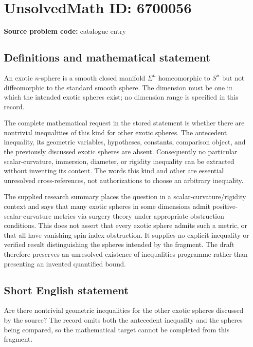 \documentclass[11pt]{article}
\begin{document}
\section*{UnsolvedMath ID: 6700056}
\textbf{Source problem code:} catalogue entry
\subsection{Definitions and mathematical statement}
An exotic \(n\)-sphere is a smooth closed manifold \(\Sigma^n\) homeomorphic to \(S^n\) but not diffeomorphic to the standard smooth sphere. The dimension must be one in which the intended exotic spheres exist; no dimension range is specified in this record.

The complete mathematical request in the stored statement is whether there are nontrivial inequalities of this kind for other exotic spheres. The antecedent inequality, its geometric variables, hypotheses, constants, comparison object, and the previously discussed exotic spheres are absent. Consequently no particular scalar-curvature, immersion, diameter, or rigidity inequality can be extracted without inventing its content. The words this kind and other are essential unresolved cross-references, not authorizations to choose an arbitrary inequality.

The supplied research summary places the question in a scalar-curvature/rigidity context and says that many exotic spheres in some dimensions admit positive-scalar-curvature metrics via surgery theory under appropriate obstruction conditions. This does not assert that every exotic sphere admits such a metric, or that all have vanishing spin-index obstruction. It supplies no explicit inequality or verified result distinguishing the spheres intended by the fragment. The draft therefore preserves an unresolved existence-of-inequalities programme rather than presenting an invented quantified bound.
\subsection{Short English statement}
Are there nontrivial geometric inequalities for the other exotic spheres discussed by the source? The record omits both the antecedent inequality and the spheres being compared, so the mathematical target cannot be completed from this fragment.
\end{document}
